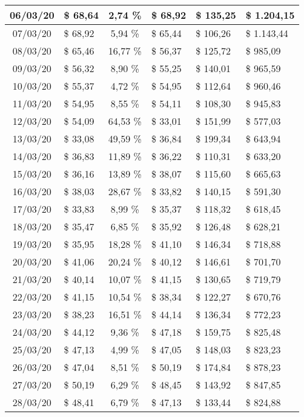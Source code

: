 \begin{center}
\begin{small}
\begin{longtable}{|c|l|c|l|l|l|}
06/03/20 & \$ 68,64 & 2,74 \% & \$ 68,92 & \$ 135,25 & \$ 1.204,15 \\ \hline
07/03/20 & \$ 68,92 & 5,94 \% & \$ 65,44 & \$ 106,26 & \$ 1.143,44 \\ \hline
08/03/20 & \$ 65,46 & 16,77 \% & \$ 56,37 & \$ 125,72 & \$ 985,09 \\ \hline
09/03/20 & \$ 56,32 & 8,90 \% & \$ 55,25 & \$ 140,01 & \$ 965,59 \\ \hline
10/03/20 & \$ 55,37 & 4,72 \% & \$ 54,95 & \$ 112,64 & \$ 960,46 \\ \hline
11/03/20 & \$ 54,95 & 8,55 \% & \$ 54,11 & \$ 108,30 & \$ 945,83 \\ \hline
12/03/20 & \$ 54,09 & 64,53 \% & \$ 33,01 & \$ 151,99 & \$ 577,03 \\ \hline
13/03/20 & \$ 33,08 & 49,59 \% & \$ 36,84 & \$ 199,34 & \$ 643,94 \\ \hline
14/03/20 & \$ 36,83 & 11,89 \% & \$ 36,22 & \$ 110,31 & \$ 633,20 \\ \hline
15/03/20 & \$ 36,16 & 13,89 \% & \$ 38,07 & \$ 115,60 & \$ 665,63 \\ \hline
16/03/20 & \$ 38,03 & 28,67 \% & \$ 33,82 & \$ 140,15 & \$ 591,30 \\ \hline
17/03/20 & \$ 33,83 & 8,99 \% & \$ 35,37 & \$ 118,32 & \$ 618,45 \\ \hline
18/03/20 & \$ 35,47 & 6,85 \% & \$ 35,92 & \$ 126,48 & \$ 628,21 \\ \hline
19/03/20 & \$ 35,95 & 18,28 \% & \$ 41,10 & \$ 146,34 & \$ 718,88 \\ \hline
20/03/20 & \$ 41,06 & 20,24 \% & \$ 40,12 & \$ 146,61 & \$ 701,70 \\ \hline
21/03/20 & \$ 40,14 & 10,07 \% & \$ 41,15 & \$ 130,65 & \$ 719,79 \\ \hline
22/03/20 & \$ 41,15 & 10,54 \% & \$ 38,34 & \$ 122,27 & \$ 670,76 \\ \hline
23/03/20 & \$ 38,23 & 16,51 \% & \$ 44,14 & \$ 136,34 & \$ 772,23 \\ \hline
24/03/20 & \$ 44,12 & 9,36 \% & \$ 47,18 & \$ 159,75 & \$ 825,48 \\ \hline
25/03/20 & \$ 47,13 & 4,99 \% & \$ 47,05 & \$ 148,03 & \$ 823,23 \\ \hline
26/03/20 & \$ 47,04 & 8,51 \% & \$ 50,19 & \$ 174,84 & \$ 878,23 \\ \hline
27/03/20 & \$ 50,19 & 6,29 \% & \$ 48,45 & \$ 143,92 & \$ 847,85 \\ \hline
28/03/20 & \$ 48,41 & 6,79 \% & \$ 47,13 & \$ 133,44 & \$ 824,88 \\ \hline

\end{longtable}
\end{small}
\end{center}
